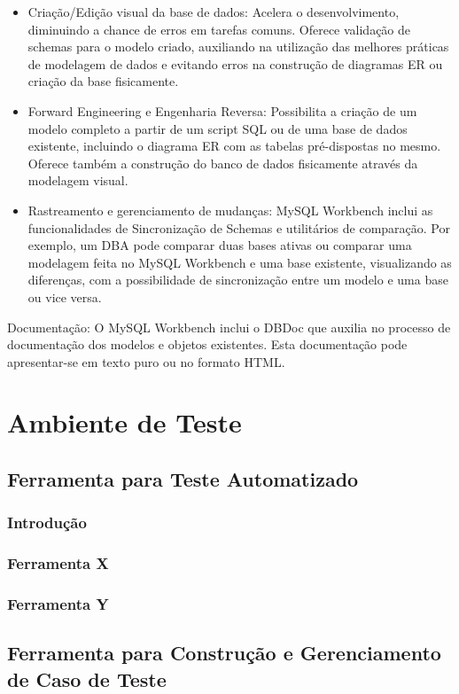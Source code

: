 \documentclass[12pt,a4paper]{article}
\begin{document}
			\begin{itemize}
			  \item Criação/Edição visual da base de dados: Acelera o desenvolvimento, diminuindo a chance de erros em tarefas
			  comuns. Oferece validação de schemas para o modelo criado, auxiliando na utilização das melhores práticas de
			  modelagem de dados e evitando erros na construção de diagramas ER ou criação da base fisicamente.
			  \item Forward Engineering e Engenharia Reversa: Possibilita a criação de um modelo completo a partir de um script
			  SQL ou de uma base de dados existente, incluindo o diagrama ER com as tabelas pré-dispostas no mesmo. Oferece
			  também a construção do banco de dados fisicamente através da modelagem visual.
			  \item Rastreamento e gerenciamento de mudanças: MySQL Workbench inclui as funcionalidades de Sincronização de
			  Schemas e utilitários de comparação. Por exemplo, um DBA pode comparar duas bases ativas ou comparar uma modelagem
			  feita no MySQL Workbench e uma base existente, visualizando as diferenças, com a possibilidade de sincronização
			  entre um modelo e uma base ou vice versa.
			\end{itemize}

			Documentação: O MySQL Workbench inclui o DBDoc que auxilia no processo de documentação dos modelos e objetos
			existentes. Esta documentação pode apresentar-se em texto puro ou no formato HTML.
		
\clearpage
\section{Ambiente de Teste}
	\subsection{Ferramenta para Teste Automatizado}
		\subsubsection{Introdução}
		\subsubsection{Ferramenta X}
		\subsubsection{Ferramenta Y}
		
	\subsection{Ferramenta para Construção e Gerenciamento de Caso de Teste}
\end{document}
